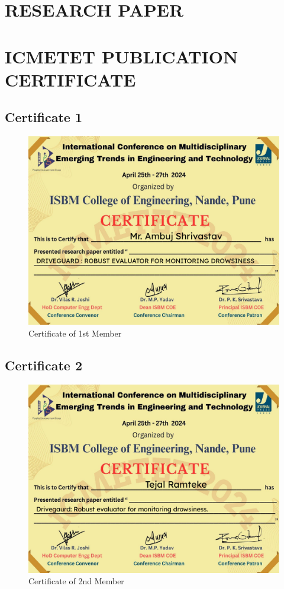 \documentclass[12pt]{article}
\begin{document}
\section{RESEARCH PAPER}

\newpage
\section{ICMETET PUBLICATION CERTIFICATE}
\subsection{Certificate 1}
\begin{figure}[htbp]
    \centering
    \includegraphics[width=1\textwidth]{cert.pdf} 
    \caption{Certificate of 1st Member}
\end{figure}
\newpage
\subsection{Certificate 2}
\begin{figure}[htbp]
    \centering
    \includegraphics[width=1\textwidth]{tejal.pdf} 
    \caption{Certificate of 2nd Member}
\end{figure}
\FloatBarrier
\newpage
\end{document}
